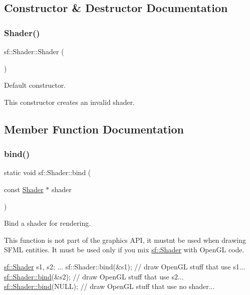 \subsection{Constructor \& Destructor Documentation}
\mbox{\label{classsf_1_1_shader_a1d7f28f26b4122959fcafec871c2c3c5}} 
\subsubsection{\texorpdfstring{Shader()}{Shader()}}
{\footnotesize\ttfamily sf\+::\+Shader\+::\+Shader (\begin{DoxyParamCaption}{ }\end{DoxyParamCaption})}



Default constructor. 

This constructor creates an invalid shader. 

\subsection{Member Function Documentation}
\mbox{\label{classsf_1_1_shader_a09778f78afcbeb854d608c8dacd8ea30}} 
\subsubsection{\texorpdfstring{bind()}{bind()}}
{\footnotesize\ttfamily static void sf\+::\+Shader\+::bind (\begin{DoxyParamCaption}\item[{const \hyperlink{classsf_1_1_shader}{Shader} $\ast$}]{shader }\end{DoxyParamCaption})\hspace{0.3cm}{\ttfamily [static]}}



Bind a shader for rendering. 

This function is not part of the graphics A\+PI, it mustn\textquotesingle{}t be used when drawing S\+F\+ML entities. It must be used only if you mix \hyperlink{classsf_1_1_shader}{sf\+::\+Shader} with Open\+GL code.


\begin{DoxyCode}
\hyperlink{classsf_1_1_shader}{sf::Shader} s1, s2;
...
sf::Shader::bind(&s1);
\textcolor{comment}{// draw OpenGL stuff that use s1...}
\hyperlink{classsf_1_1_shader_a09778f78afcbeb854d608c8dacd8ea30}{sf::Shader::bind}(&s2);
\textcolor{comment}{// draw OpenGL stuff that use s2...}
\hyperlink{classsf_1_1_shader_a09778f78afcbeb854d608c8dacd8ea30}{sf::Shader::bind}(NULL);
\textcolor{comment}{// draw OpenGL stuff that use no shader...}
\end{DoxyCode}



